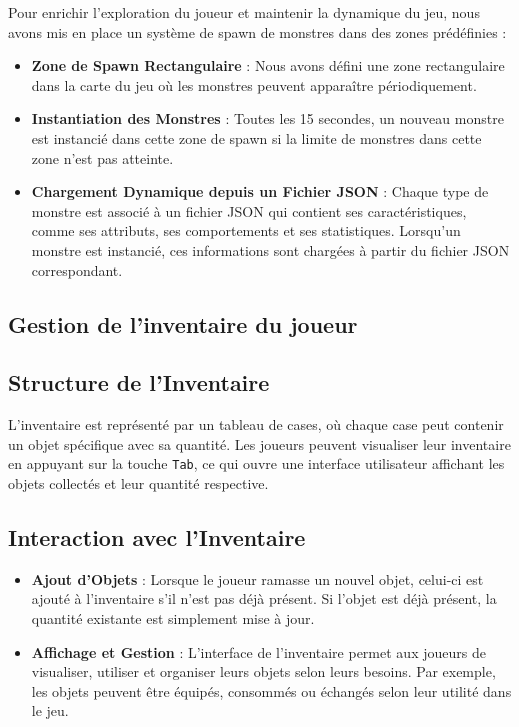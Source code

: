 Pour enrichir l'exploration du joueur et maintenir la dynamique du jeu, nous avons mis en place un système de spawn de monstres dans des zones prédéfinies :
\\

\begin{itemize}
    \item \textbf{Zone de Spawn Rectangulaire} : Nous avons défini une zone rectangulaire dans la carte du jeu où les monstres peuvent apparaître périodiquement.
    \\

    \item \textbf{Instantiation des Monstres} : Toutes les 15 secondes, un nouveau monstre est instancié dans cette zone de spawn si la limite de monstres dans
     cette zone n'est pas atteinte.
    \\

    \item \textbf{Chargement Dynamique depuis un Fichier JSON} : Chaque type de monstre est associé à un fichier 
    JSON qui contient ses caractéristiques, comme ses attributs, ses comportements et ses statistiques. Lorsqu'un monstre est instancié, 
    ces informations sont chargées à partir du fichier JSON correspondant.
\end{itemize}

\subsection{Gestion de l'inventaire du joueur }

\subsection*{Structure de l'Inventaire}

L'inventaire est représenté par un tableau de cases, où chaque case peut contenir un objet spécifique avec sa quantité. 
Les joueurs peuvent visualiser leur inventaire en appuyant sur la touche \texttt{Tab}, ce qui ouvre une interface utilisateur affichant 
les objets collectés et leur quantité respective.

\subsection*{Interaction avec l'Inventaire}

\begin{itemize}
    \item \textbf{Ajout d'Objets} : Lorsque le joueur ramasse un nouvel objet, celui-ci est ajouté à l'inventaire s'il n'est pas déjà présent. 
    Si l'objet est déjà présent, la quantité existante est simplement mise à jour.
    \\
    \item \textbf{Affichage et Gestion} : L'interface de l'inventaire permet aux joueurs de visualiser, utiliser et organiser leurs objets selon 
    leurs besoins. Par exemple, les objets peuvent être équipés, consommés ou échangés selon leur utilité dans le jeu.
\end{itemize}




